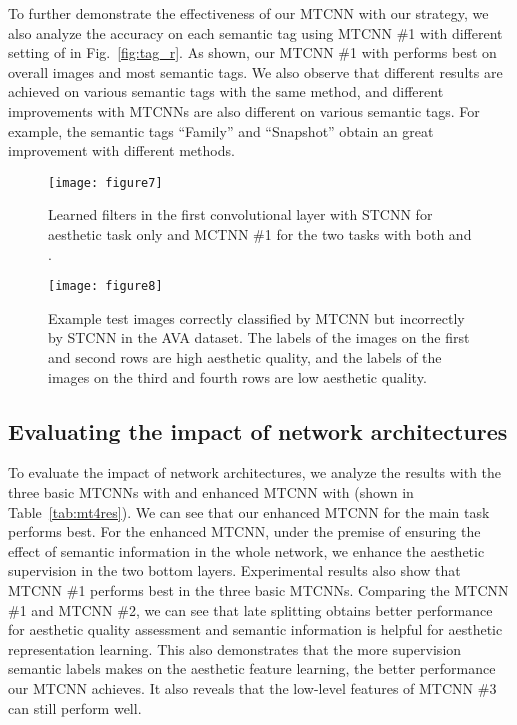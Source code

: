 \documentclass[journal]{IEEEtran}
\begin{document}
To further demonstrate the effectiveness of our MTCNN with our strategy, we also analyze the accuracy on each semantic tag using MTCNN \#1 with different setting of  in Fig.~\ref{fig:tag_r}. As shown, our MTCNN \#1 with  performs best on overall images and most semantic tags. We also observe that different results are achieved on various semantic tags with the same method, and different improvements with MTCNNs are also different on various semantic tags. For example, the semantic tags ``Family'' and ``Snapshot'' obtain an great improvement with different methods.



 \begin{figure*}
  \centering
\texttt{[image: figure7]}\\
\caption{Learned filters in the first convolutional layer with STCNN for aesthetic task only and MCTNN \#1 for the two tasks with both  and . }
  \label{fig:filter}
\end{figure*}
\begin{figure*}
  \centering
\texttt{[image: figure8]}\\
\caption{Example test images correctly classified by MTCNN but incorrectly by STCNN in the AVA dataset. The labels of the images on the first and second rows are high aesthetic quality, and the labels of the images on the third and fourth rows are low aesthetic quality. }
  \label{fig:examp}
\end{figure*}
\subsection{Evaluating the impact of network architectures}
To evaluate the impact of network architectures, we analyze the results with the three basic MTCNNs with  and enhanced MTCNN with  (shown in Table~\ref{tab:mt4res}). We can see that our enhanced MTCNN for the main task performs best. For the enhanced MTCNN, under the premise of ensuring the effect of semantic information in the whole network, we enhance the aesthetic supervision in the two bottom layers. Experimental results also show that MTCNN \#1 performs best in the three basic MTCNNs. Comparing the MTCNN \#1 and MTCNN \#2, we can see that late splitting obtains better performance for aesthetic quality assessment and semantic information is helpful for aesthetic representation learning. This also demonstrates that the more supervision semantic labels makes on the aesthetic feature learning, the better performance our MTCNN achieves. It also reveals that the low-level features of MTCNN \#3 can still perform well.
\end{document}
